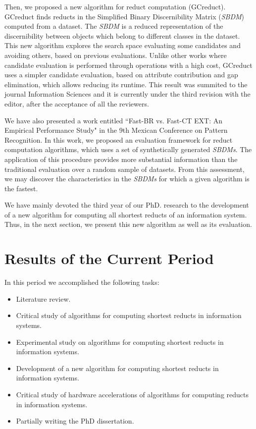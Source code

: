 \documentclass[authoryear,11pt]{elsarticle}
\begin{document}
  Then, we proposed a new algorithm for reduct computation (GCreduct). GCreduct finds reducts in the Simplified Binary Discernibility Matrix (\textit{SBDM}) computed from a dataset. The \textit{SBDM} is a reduced representation of the discernibility between objects which belong to different classes in the dataset. This new algorithm explores the search space evaluating some candidates and avoiding others, based on previous evaluations. Unlike other works \citep{WangP07,Lias13} where candidate evaluation is performed through operations with a high cost, GCreduct uses a simpler candidate evaluation, based on attribute contribution and gap elimination, which allows reducing its runtime. This result was summited to the journal Information Sciences and it is currently under the third revision with the editor, after the acceptance of all the reviewers.
  
  We have also presented a work entitled ``Fast-BR vs. Fast-CT EXT: An Empirical Performance Study" in the 9th Mexican Conference on Pattern Recognition. In this work, we proposed an evaluation framework for reduct computation algorithms, which uses a set of synthetically generated \textit{SBDMs}. The application of this procedure provides more substantial information than the traditional evaluation over a random sample of datasets. From this assessment, we may discover the characteristics in the \textit{SBDMs} for which a given algorithm is the fastest.
  
  We have mainly devoted the third year of our PhD. research to  the development of a new algorithm for computing all shortest reducts of an information system. Thus, in the next section, we present this new algorithm as well as its evaluation.


\section{Results of the Current Period}\label{current_results}
  In this period we accomplished the following tasks:
  \begin{itemize}
  	\itemsep0em 
  	\item Literature review.
  	\item Critical study of algorithms for computing shortest reducts in information systems.
  	\item Experimental study on algorithms for computing shortest reducts in information systems.
  	\item Development of a new algorithm for computing shortest reducts in information systems.
  	\item Critical study of hardware accelerations of algorithms for computing reducts in information systems.
  	\item Partially writing the PhD dissertation.
  \end{itemize}
  
\end{document}
